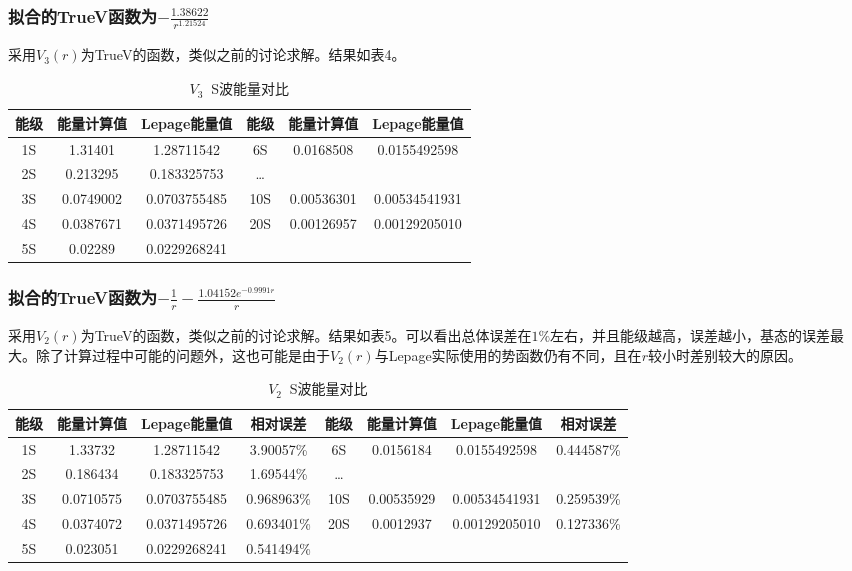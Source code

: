 \documentclass{ctexart}
\begin{document}
\subsubsection{拟合的TrueV函数为$\displaystyle-\frac{1.38622}{r^{1.21524}}$}
采用$V_3(r)$为TrueV的函数，类似之前的讨论求解。结果如表4。
\begin{table}[!htbp]
  \centering
  \begin{tabular}{|cccccc|}
    \hline
    能级 & 能量计算值 & Lepage能量值 & 能级 & 能量计算值 & Lepage能量值 \\
    \hline
    1S & 1.31401 & 1.28711542 & 6S & 0.0168508 & 0.0155492598 \\
    2S & 0.213295 & 0.183325753  & \dots &   & \\
    3S & 0.0749002 & 0.0703755485 & 10S & 0.00536301 & 0.00534541931 \\
    4S & 0.0387671 & 0.0371495726 & 20S & 0.00126957 & 0.00129205010 \\
    5S & 0.02289 & 0.0229268241  &  &  &  \\
    \hline
  \end{tabular}
  \caption{$V_3\;\;$S波能量对比}
\end{table}
\subsubsection{拟合的TrueV函数为$\displaystyle-\frac{1}{r}-\frac{1.04152e^{-0.9991r}}{r}$}
采用$V_2(r)$为TrueV的函数，类似之前的讨论求解。结果如表5。可以看出总体误差在$1\%$左右，并且能级越高，误差越小，基态的误差最大。除了计算过程中可能的问题外，这也可能是由于$V_2(r)$与Lepage实际使用的势函数仍有不同，且在$r$较小时差别较大的原因。
\clearpage
\begin{table}[!htbp]
  \centering
  \begin{tabular}{|cccccccc|}
    \hline
    能级 & 能量计算值 & Lepage能量值 & 相对误差 & 能级 & 能量计算值 & Lepage能量值 & 相对误差 \\
    \hline
    1S & 1.33732 & 1.28711542 & 3.90057\% & 6S & 0.0156184 & 0.0155492598 & 0.444587\% \\
    2S & 0.186434 & 0.183325753 & 1.69544\% & \dots &   &  & \\
    3S & 0.0710575 & 0.0703755485 & 0.968963\% & 10S & 0.00535929 & 0.00534541931 & 0.259539\% \\
    4S & 0.0374072 & 0.0371495726 & 0.693401\% & 20S & 0.0012937 & 0.00129205010 &0.127336\%\\
    5S & 0.023051 & 0.0229268241 & 0.541494\% &  &  & & \\
    \hline
  \end{tabular}
  \caption{$V_2\;\;$S波能量对比}
\end{table}
\end{document}
